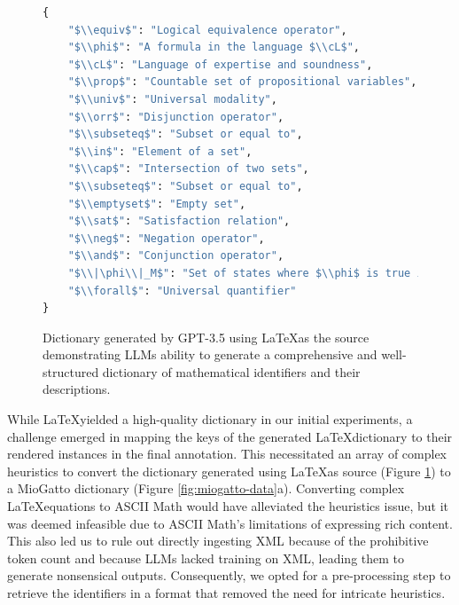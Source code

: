 \begin{figure}[htpb]
  \centering
  \begin{lstlisting}[language=python]
{    
    "$\\equiv$": "Logical equivalence operator",
    "$\\phi$": "A formula in the language $\\cL$",
    "$\\cL$": "Language of expertise and soundness",
    "$\\prop$": "Countable set of propositional variables",
    "$\\univ$": "Universal modality",
    "$\\orr$": "Disjunction operator",
    "$\\subseteq$": "Subset or equal to",
    "$\\in$": "Element of a set",
    "$\\cap$": "Intersection of two sets",
    "$\\subseteq$": "Subset or equal to",
    "$\\emptyset$": "Empty set",
    "$\\sat$": "Satisfaction relation",
    "$\\neg$": "Negation operator",
    "$\\and$": "Conjunction operator",
    "$\\|\phi\\|_M$": "Set of states where $\\phi$ is true in model $M$",
    "$\\forall$": "Universal quantifier"
}
  \end{lstlisting}
  \caption[GPT Dictionary from LaTeX]{Dictionary generated by GPT-3.5 using \LaTeX \space as the source demonstrating LLMs ability to generate a comprehensive and well-structured dictionary of mathematical identifiers and their descriptions.}\label{fig:latex-dict}
\end{figure}

While \LaTeX \space yielded a high-quality dictionary in our initial experiments, a challenge emerged in mapping the keys of the generated \LaTeX \space dictionary to their rendered instances in the final annotation. This necessitated an array of complex heuristics to convert the dictionary generated using \LaTeX \space as source (Figure \ref{fig:latex-dict}) to a MioGatto dictionary (Figure \ref{fig:miogatto-data}a). Converting complex \LaTeX \space equations to ASCII Math would have alleviated the heuristics issue, but it was deemed infeasible due to ASCII Math's limitations of expressing rich content. This also led us to rule out directly ingesting XML because of the prohibitive token count and because \ac{LLMs} lacked training on XML, leading them to generate nonsensical outputs. Consequently, we opted for a pre-processing step to retrieve the identifiers in a format that removed the need for intricate heuristics.


